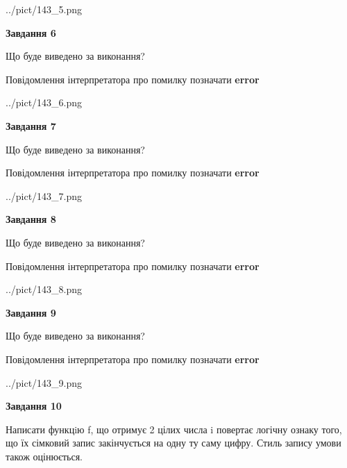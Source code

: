 \documentclass[12pt, ukrainian]{article}
\begin{document}
{\begin {large}
\begin{center}
	{../pict/143_5.png}
\end{center}
\newpage

{\begin {center}\textbf{Завдання 6}\end {center}}\par
Що буде виведено за виконання? \par
Повідомлення інтерпретатора про помилку позначати \textbf{error}

\begin{center}
	{../pict/143_6.png}
\end{center}
\newpage

{\begin {center}\textbf{Завдання 7}\end {center}}\par
Що буде виведено за виконання? \par
Повідомлення інтерпретатора про помилку позначати \textbf{error}

\begin{center}
	{../pict/143_7.png}
\end{center}
\newpage

{\begin {center}\textbf{Завдання 8}\end {center}}\par
Що буде виведено за виконання? \par
Повідомлення інтерпретатора про помилку позначати \textbf{error}

\begin{center}
	{../pict/143_8.png}
\end{center}
\newpage

{\begin {center}\textbf{Завдання 9}\end {center}}\par
Що буде виведено за виконання? \par
Повідомлення інтерпретатора про помилку позначати \textbf{error}

\begin{center}
	{../pict/143_9.png}
\end{center}
\newpage

{\begin {center}\textbf{Завдання 10}\end {center}}\par

Написати функцiю f, що отримує 2 цілих числа i повертає логічну ознаку того, що їх сімковий запис закінчується на одну ту саму цифру. Стиль запису умови також оцінюється.\par
\newpage

\end {large}}
\end{document}
